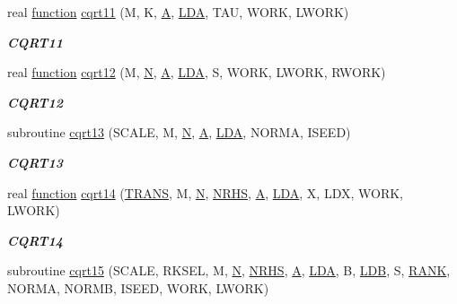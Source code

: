 \begin{DoxyCompactItemize}
real \hyperlink{afunc_8m_a7b5e596df91eadea6c537c0825e894a7}{function} \hyperlink{group__complex__lin_ga5ddf269f54ddedda4dd611897a6ace3b}{cqrt11} (M, K, \hyperlink{classA}{A}, \hyperlink{example__user_8c_ae946da542ce0db94dced19b2ecefd1aa}{L\+D\+A}, T\+A\+U, W\+O\+R\+K, L\+W\+O\+R\+K)
\begin{DoxyCompactList}\small\item\em {\bfseries C\+Q\+R\+T11} \end{DoxyCompactList}\item 
real \hyperlink{afunc_8m_a7b5e596df91eadea6c537c0825e894a7}{function} \hyperlink{group__complex__lin_gaf19bfcc505b7305555dde48fb54a6365}{cqrt12} (M, \hyperlink{polmisc_8c_a0240ac851181b84ac374872dc5434ee4}{N}, \hyperlink{classA}{A}, \hyperlink{example__user_8c_ae946da542ce0db94dced19b2ecefd1aa}{L\+D\+A}, S, W\+O\+R\+K, L\+W\+O\+R\+K, R\+W\+O\+R\+K)
\begin{DoxyCompactList}\small\item\em {\bfseries C\+Q\+R\+T12} \end{DoxyCompactList}\item 
subroutine \hyperlink{group__complex__lin_ga742c22962e1a1ee0e8f1a3bf4e0cc1d9}{cqrt13} (S\+C\+A\+L\+E, M, \hyperlink{polmisc_8c_a0240ac851181b84ac374872dc5434ee4}{N}, \hyperlink{classA}{A}, \hyperlink{example__user_8c_ae946da542ce0db94dced19b2ecefd1aa}{L\+D\+A}, N\+O\+R\+M\+A, I\+S\+E\+E\+D)
\begin{DoxyCompactList}\small\item\em {\bfseries C\+Q\+R\+T13} \end{DoxyCompactList}\item 
real \hyperlink{afunc_8m_a7b5e596df91eadea6c537c0825e894a7}{function} \hyperlink{group__complex__lin_ga0f92c9b88bcef46b2921aa0d8c69c02a}{cqrt14} (\hyperlink{superlu__enum__consts_8h_a0c4e17b2d5cea33f9991ccc6a6678d62a1f61e3015bfe0f0c2c3fda4c5a0cdf58}{T\+R\+A\+N\+S}, M, \hyperlink{polmisc_8c_a0240ac851181b84ac374872dc5434ee4}{N}, \hyperlink{example__user_8c_aa0138da002ce2a90360df2f521eb3198}{N\+R\+H\+S}, \hyperlink{classA}{A}, \hyperlink{example__user_8c_ae946da542ce0db94dced19b2ecefd1aa}{L\+D\+A}, X, L\+D\+X, W\+O\+R\+K, L\+W\+O\+R\+K)
\begin{DoxyCompactList}\small\item\em {\bfseries C\+Q\+R\+T14} \end{DoxyCompactList}\item 
subroutine \hyperlink{group__complex__lin_gaf0759d81c8e18be6516d171e12c1171d}{cqrt15} (S\+C\+A\+L\+E, R\+K\+S\+E\+L, M, \hyperlink{polmisc_8c_a0240ac851181b84ac374872dc5434ee4}{N}, \hyperlink{example__user_8c_aa0138da002ce2a90360df2f521eb3198}{N\+R\+H\+S}, \hyperlink{classA}{A}, \hyperlink{example__user_8c_ae946da542ce0db94dced19b2ecefd1aa}{L\+D\+A}, B, \hyperlink{example__user_8c_a50e90a7104df172b5a89a06c47fcca04}{L\+D\+B}, S, \hyperlink{splinemodule_8c_a3a88bcc63386de30443dacede2e01847}{R\+A\+N\+K}, N\+O\+R\+M\+A, N\+O\+R\+M\+B, I\+S\+E\+E\+D, W\+O\+R\+K, L\+W\+O\+R\+K)

\end{DoxyCompactItemize}
